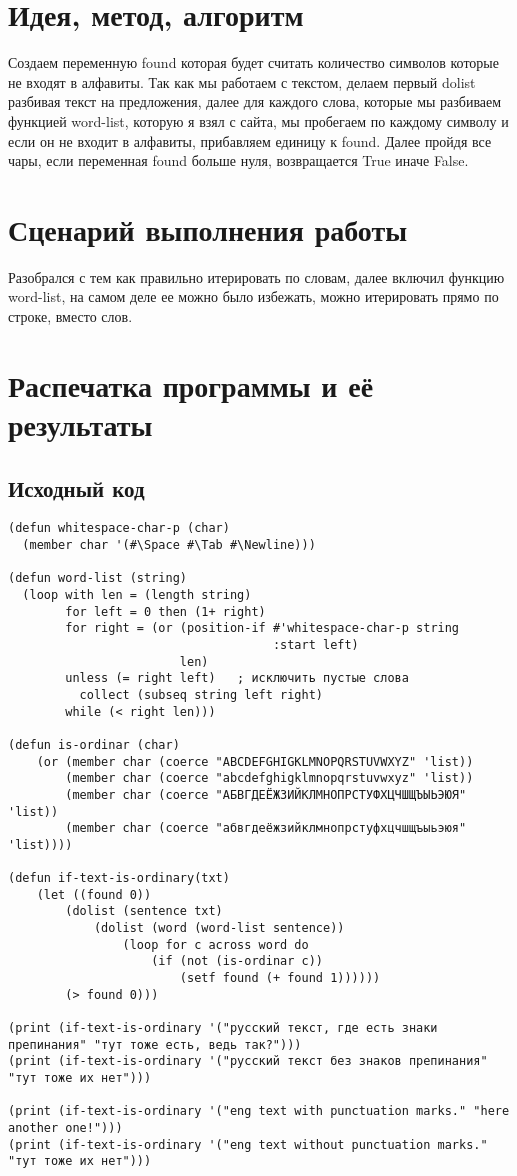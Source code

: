 \documentclass[15pt]{extarticle}
\begin{document}
\section{Идея, метод, алгоритм}
Создаем переменную found которая будет считать количество символов которые не входят в алфавиты. Так как мы работаем с текстом, делаем первый dolist разбивая текст на предложения, далее для каждого слова, которые мы разбиваем функцией word-list, которую я взял с сайта, мы пробегаем по каждому символу и если он не входит в алфавиты, прибавляем единицу к found. Далее пройдя все чары, если переменная found больше нуля, возвращается True иначе False.

\section{Сценарий выполнения работы}
Разобрался с тем как правильно итерировать по словам, далее включил функцию word-list, на самом деле ее можно было избежать, можно итерировать прямо по строке, вместо слов.

\section{Распечатка программы и её результаты}

\subsection{Исходный код}

\begin{lstlisting}
(defun whitespace-char-p (char)
  (member char '(#\Space #\Tab #\Newline)))

(defun word-list (string)
  (loop with len = (length string)
        for left = 0 then (1+ right)
        for right = (or (position-if #'whitespace-char-p string
                                     :start left)
                        len)
        unless (= right left)	; исключить пустые слова
          collect (subseq string left right)
        while (< right len)))

(defun is-ordinar (char)
    (or (member char (coerce "ABCDEFGHIGKLMNOPQRSTUVWXYZ" 'list))
        (member char (coerce "abcdefghigklmnopqrstuvwxyz" 'list))
        (member char (coerce "АБВГДЕЁЖЗИЙКЛМНОПРСТУФХЦЧШЩЪЫЬЭЮЯ" 'list))
        (member char (coerce "абвгдеёжзийклмнопрстуфхцчшщъыьэюя" 'list))))

(defun if-text-is-ordinary(txt)
    (let ((found 0))
        (dolist (sentence txt)
            (dolist (word (word-list sentence))
                (loop for c across word do
                    (if (not (is-ordinar c))
                        (setf found (+ found 1))))))
        (> found 0)))

(print (if-text-is-ordinary '("русский текст, где есть знаки препинания" "тут тоже есть, ведь так?")))
(print (if-text-is-ordinary '("русский текст без знаков препинания" "тут тоже их нет")))

(print (if-text-is-ordinary '("eng text with punctuation marks." "here another one!")))
(print (if-text-is-ordinary '("eng text without punctuation marks." "тут тоже их нет")))
\end{lstlisting}
\end{document}
